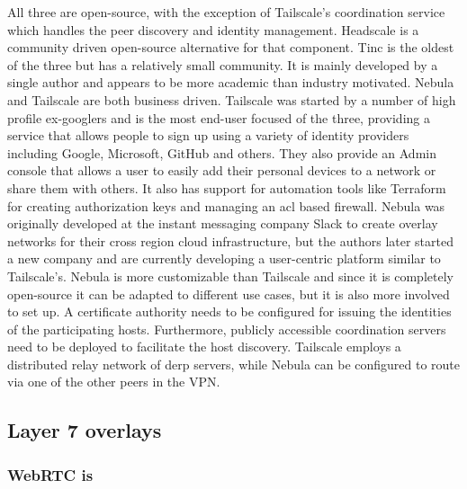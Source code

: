 All three are open-source, with the exception of Tailscale's
coordination service which handles the peer discovery and identity
management. Headscale \autocite{fontJuanfontHeadscale2022} is a
community driven open-source alternative for that component. Tinc is the
oldest of the three but has a relatively small community. It is mainly
developed by a single author and appears to be more academic than
industry motivated. Nebula and Tailscale are both business driven.
Tailscale was started by a number of high profile ex-googlers and is the
most end-user focused of the three, providing a service that allows
people to sign up using a variety of identity providers including
Google, Microsoft, GitHub and others. They also provide an Admin console
that allows a user to easily add their personal devices to a network or
share them with others. It also has support for automation tools like
Terraform for creating authorization keys and managing an \gls{acl}
based firewall. Nebula was originally developed at the instant messaging
company Slack to create overlay networks for their cross region cloud
infrastructure, but the authors later started a new company and are
currently developing a user-centric platform similar to Tailscale's.
Nebula is more customizable than Tailscale and since it is completely
open-source it can be adapted to different use cases, but it is also
more involved to set up. A certificate authority needs to be configured
for issuing the identities of the participating hosts. Furthermore,
publicly accessible coordination servers need to be deployed to
facilitate the host discovery. Tailscale employs a distributed relay
network of \gls{derp} servers, while Nebula can be configured to route
via one of the other peers in the VPN.

\hypertarget{thesis__020-related-work.md__layer-7-overlays}{%
\subsection{Layer 7
overlays}\label{thesis__020-related-work.md__layer-7-overlays}}

\hypertarget{thesis__020-related-work.md__webrtc-is}{%
\subsubsection{WebRTC is}\label{thesis__020-related-work.md__webrtc-is}}


